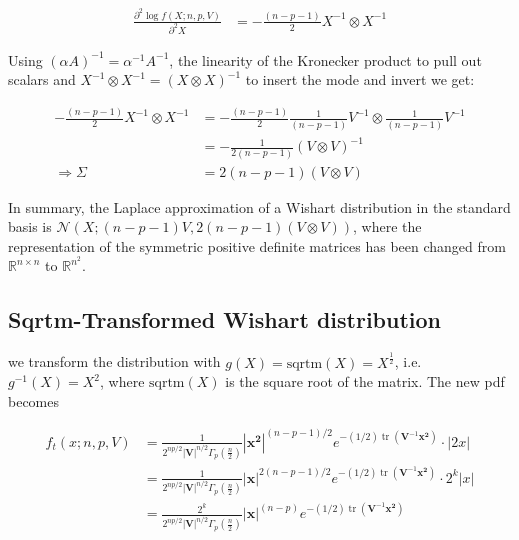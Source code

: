 \begin{align*}
	\frac{\partial^2 \log f(X; n,p,V)}{\partial^2 X} &= -\frac{(n-p-1)}{2} X^{-1} \otimes X^{-1}
\end{align*}

Using $(\alpha A)^{-1} = \alpha^{-1}A^{-1}$, the linearity of the Kronecker product to pull out scalars and $X^{-1} \otimes X^{-1} = (X \otimes X)^{-1}$ to insert the mode and invert we get:

\begin{align*}
	-\frac{(n-p-1)}{2} X^{-1} \otimes X^{-1} &= -\frac{(n-p-1)}{2} \frac{1}{(n-p-1)} V^{-1} \otimes \frac{1}{(n-p-1)} V^{-1} \\
	&= -\frac{1}{2(n-p-1)}(V \otimes V)^{-1} \\
	\Rightarrow \Sigma &= 2(n-p-1)(V\otimes V)
\end{align*}

In summary, the Laplace approximation of a Wishart distribution in the standard basis is $\mathcal{N}\left(X; (n-p-1)V, 2(n-p-1)(V\otimes V)\right)$, where the representation of the symmetric positive definite matrices has been changed from $\mathbb{R}^{n\times n}$ to $\mathbb{R}^{n^2}$.


\subsection{Sqrtm-Transformed Wishart distribution}

we transform the distribution with $g(X) = \text{sqrtm}(X) = X^{\frac{1}{2}}$, i.e. $g^{-1}(X) = X^2$, where $\text{sqrtm}(X)$ is the square root of the matrix. The new pdf becomes

\begin{align}
	f_t(x; n,p,V) &= \frac{1}{2^{np/2} \left|{\mathbf V}\right|^{n/2} \Gamma_p\left(\frac {n}{2}\right ) }{\left|\mathbf{x^2}\right|}^{(n-p-1)/2} e^{-(1/2)\operatorname{tr}({\mathbf V}^{-1}\mathbf{x^2})} \cdot |2x| \\ \nonumber
	&= \frac{1}{2^{np/2} \left|{\mathbf V}\right|^{n/2} \Gamma_p\left(\frac {n}{2}\right ) }{\left|\mathbf{x}\right|}^{2(n-p-1)/2} e^{-(1/2)\operatorname{tr}({\mathbf V}^{-1}\mathbf{x^2})} \cdot 2^k|x| \\
	&= \frac{2^k}{2^{np/2} \left|{\mathbf V}\right|^{n/2} \Gamma_p\left(\frac {n}{2}\right ) }{\left|\mathbf{x}\right|}^{(n-p)} e^{-(1/2)\operatorname{tr}({\mathbf V}^{-1}\mathbf{x^2})} \nonumber
	\label{eq:wishart_trans_sqrtm_pdf}
\end{align}

